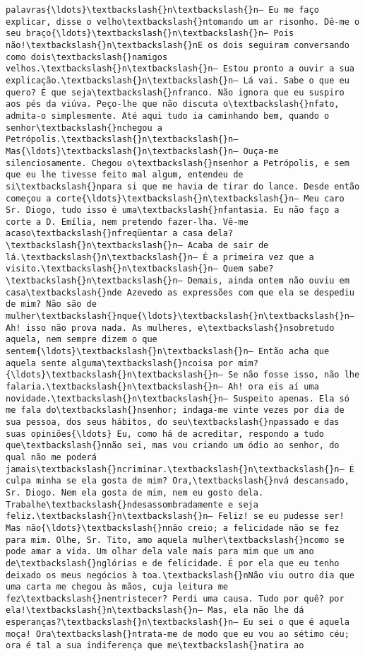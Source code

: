 \documentclass[11pt]{article}
\begin{document}
\begin{Verbatim}[commandchars=\\\{\}]
palavras{\ldots}\textbackslash{}n\textbackslash{}n— Eu me faço explicar, disse o velho\textbackslash{}ntomando um ar risonho. Dê-me o seu braço{\ldots}\textbackslash{}n\textbackslash{}n— Pois não!\textbackslash{}n\textbackslash{}nE os dois seguiram conversando como dois\textbackslash{}namigos velhos.\textbackslash{}n\textbackslash{}n— Estou pronto a ouvir a sua explicação.\textbackslash{}n\textbackslash{}n— Lá vai. Sabe o que eu quero? É que seja\textbackslash{}nfranco. Não ignora que eu suspiro aos pés da viúva. Peço-lhe que não discuta o\textbackslash{}nfato, admita-o simplesmente. Até aqui tudo ia caminhando bem, quando o senhor\textbackslash{}nchegou a Petrópolis.\textbackslash{}n\textbackslash{}n— Mas{\ldots}\textbackslash{}n\textbackslash{}n— Ouça-me silenciosamente. Chegou o\textbackslash{}nsenhor a Petrópolis, e sem que eu lhe tivesse feito mal algum, entendeu de si\textbackslash{}npara si que me havia de tirar do lance. Desde então começou a corte{\ldots}\textbackslash{}n\textbackslash{}n— Meu caro Sr. Diogo, tudo isso é uma\textbackslash{}nfantasia. Eu não faço a corte a D. Emília, nem pretendo fazer-lha. Vê-me acaso\textbackslash{}nfreqüentar a casa dela?\textbackslash{}n\textbackslash{}n— Acaba de sair de lá.\textbackslash{}n\textbackslash{}n— É a primeira vez que a visito.\textbackslash{}n\textbackslash{}n— Quem sabe?\textbackslash{}n\textbackslash{}n— Demais, ainda ontem não ouviu em casa\textbackslash{}nde Azevedo as expressões com que ela se despediu de mim? Não são de mulher\textbackslash{}nque{\ldots}\textbackslash{}n\textbackslash{}n— Ah! isso não prova nada. As mulheres, e\textbackslash{}nsobretudo aquela, nem sempre dizem o que sentem{\ldots}\textbackslash{}n\textbackslash{}n— Então acha que aquela sente alguma\textbackslash{}ncoisa por mim?{\ldots}\textbackslash{}n\textbackslash{}n— Se não fosse isso, não lhe falaria.\textbackslash{}n\textbackslash{}n— Ah! ora eis aí uma novidade.\textbackslash{}n\textbackslash{}n— Suspeito apenas. Ela só me fala do\textbackslash{}nsenhor; indaga-me vinte vezes por dia de sua pessoa, dos seus hábitos, do seu\textbackslash{}npassado e das suas opiniões{\ldots} Eu, como há de acreditar, respondo a tudo que\textbackslash{}nnão sei, mas vou criando um ódio ao senhor, do qual não me poderá jamais\textbackslash{}ncriminar.\textbackslash{}n\textbackslash{}n— É culpa minha se ela gosta de mim? Ora,\textbackslash{}nvá descansado, Sr. Diogo. Nem ela gosta de mim, nem eu gosto dela. Trabalhe\textbackslash{}ndesassombradamente e seja feliz.\textbackslash{}n\textbackslash{}n— Feliz! se eu pudesse ser! Mas não{\ldots}\textbackslash{}nnão creio; a felicidade não se fez para mim. Olhe, Sr. Tito, amo aquela mulher\textbackslash{}ncomo se pode amar a vida. Um olhar dela vale mais para mim que um ano de\textbackslash{}nglórias e de felicidade. É por ela que eu tenho deixado os meus negócios à toa.\textbackslash{}nNão viu outro dia que uma carta me chegou às mãos, cuja leitura me fez\textbackslash{}nentristecer? Perdi uma causa. Tudo por quê? por ela!\textbackslash{}n\textbackslash{}n— Mas, ela não lhe dá esperanças?\textbackslash{}n\textbackslash{}n— Eu sei o que é aquela moça! Ora\textbackslash{}ntrata-me de modo que eu vou ao sétimo céu; ora é tal a sua indiferença que me\textbackslash{}natira ao 
\end{Verbatim}
\end{document}
